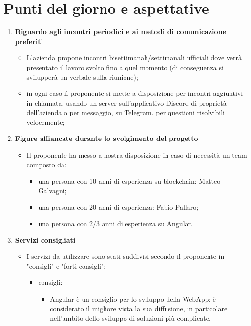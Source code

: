 \section{Punti del giorno e aspettative}

\begin{enumerate}
    \item \textbf{Riguardo agli incontri periodici e ai metodi di comunicazione preferiti}
    \begin{itemize}
        \item L'azienda propone incontri bisettimanali/settimanali ufficiali dove verrà presentato il lavoro svolto fino a quel momento (di conseguenza si svilupperà un verbale sulla riunione);
        \item in ogni caso il proponente si mette a disposizione per incontri aggiuntivi in chiamata, usando un server sull'applicativo Discord di proprietà dell'azienda o per messaggio, su Telegram, per questioni risolvibili velocemente;
    \end{itemize}
    \item \textbf{Figure affiancate durante lo svolgimento del progetto}
        \begin{itemize}
            \item Il proponente ha messo a nostra disposizione in caso di necessità un team composto da:
            \begin{itemize}
                \item una persona con 10 anni di esperienza su blockchain: Matteo Galvagni;
                \item una persona con 20 anni di esperienza: Fabio Pallaro;
                \item una persona con 2/3 anni di esperienza su Angular.
            \end{itemize}
        \end{itemize}
    \item \textbf{Servizi consigliati}
        \begin{itemize}
            \item I servizi da utilizzare sono stati suddivisi secondo il proponente in "consigli" e "forti consigli":
            \begin{itemize}
                \item consigli:
                \begin{itemize}
                    \item Angular è un consiglio per lo sviluppo della WebApp: è considerato il migliore vista la sua diffusione, in particolare nell'ambito dello sviluppo di soluzioni più complicate.
                

\end{itemize}
\end{itemize}
\end{itemize}
\end{enumerate}

